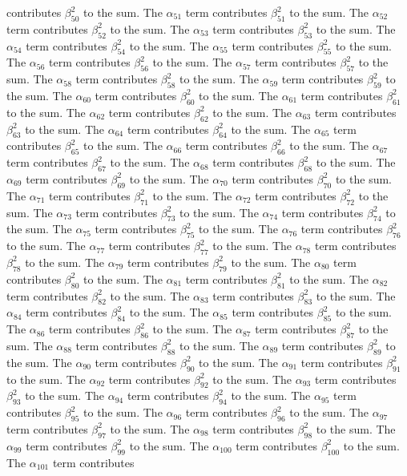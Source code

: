 \begin{lemma}
contributes $\beta_{50}^{2}$ to the sum. The $\alpha_{51}$ term contributes $\beta_{51}^{2}$ to the sum. The $\alpha_{52}$ term contributes $\beta_{52}^{2}$ to the sum. The $\alpha_{53}$ term contributes $\beta_{53}^{2}$ to the sum. The $\alpha_{54}$ term contributes $\beta_{54}^{2}$ to the sum. The $\alpha_{55}$ term contributes $\beta_{55}^{2}$ to the sum. The $\alpha_{56}$ term contributes $\beta_{56}^{2}$ to the sum. The $\alpha_{57}$ term contributes $\beta_{57}^{2}$ to the sum. The $\alpha_{58}$ term contributes $\beta_{58}^{2}$ to the sum. The $\alpha_{59}$ term contributes $\beta_{59}^{2}$ to the sum. The $\alpha_{60}$ term contributes $\beta_{60}^{2}$ to the sum. The $\alpha_{61}$ term contributes $\beta_{61}^{2}$ to the sum. The $\alpha_{62}$ term contributes $\beta_{62}^{2}$ to the sum. The $\alpha_{63}$ term contributes $\beta_{63}^{2}$ to the sum. The $\alpha_{64}$ term contributes $\beta_{64}^{2}$ to the sum. The $\alpha_{65}$ term contributes $\beta_{65}^{2}$ to the sum. The $\alpha_{66}$ term contributes $\beta_{66}^{2}$ to the sum. The $\alpha_{67}$ term contributes $\beta_{67}^{2}$ to the sum. The $\alpha_{68}$ term contributes $\beta_{68}^{2}$ to the sum. The $\alpha_{69}$ term contributes $\beta_{69}^{2}$ to the sum. The $\alpha_{70}$ term contributes $\beta_{70}^{2}$ to the sum. The $\alpha_{71}$ term contributes $\beta_{71}^{2}$ to the sum. The $\alpha_{72}$ term contributes $\beta_{72}^{2}$ to the sum. The $\alpha_{73}$ term contributes $\beta_{73}^{2}$ to the sum. The $\alpha_{74}$ term contributes $\beta_{74}^{2}$ to the sum. The $\alpha_{75}$ term contributes $\beta_{75}^{2}$ to the sum. The $\alpha_{76}$ term contributes $\beta_{76}^{2}$ to the sum. The $\alpha_{77}$ term contributes $\beta_{77}^{2}$ to the sum. The $\alpha_{78}$ term contributes $\beta_{78}^{2}$ to the sum. The $\alpha_{79}$ term contributes $\beta_{79}^{2}$ to the sum. The $\alpha_{80}$ term contributes $\beta_{80}^{2}$ to the sum. The $\alpha_{81}$ term contributes $\beta_{81}^{2}$ to the sum. The $\alpha_{82}$ term contributes $\beta_{82}^{2}$ to the sum. The $\alpha_{83}$ term contributes $\beta_{83}^{2}$ to the sum. The $\alpha_{84}$ term contributes $\beta_{84}^{2}$ to the sum. The $\alpha_{85}$ term contributes $\beta_{85}^{2}$ to the sum. The $\alpha_{86}$ term contributes $\beta_{86}^{2}$ to the sum. The $\alpha_{87}$ term contributes $\beta_{87}^{2}$ to the sum. The $\alpha_{88}$ term contributes $\beta_{88}^{2}$ to the sum. The $\alpha_{89}$ term contributes $\beta_{89}^{2}$ to the sum. The $\alpha_{90}$ term contributes $\beta_{90}^{2}$ to the sum. The $\alpha_{91}$ term contributes $\beta_{91}^{2}$ to the sum. The $\alpha_{92}$ term contributes $\beta_{92}^{2}$ to the sum. The $\alpha_{93}$ term contributes $\beta_{93}^{2}$ to the sum. The $\alpha_{94}$ term contributes $\beta_{94}^{2}$ to the sum. The $\alpha_{95}$ term contributes $\beta_{95}^{2}$ to the sum. The $\alpha_{96}$ term contributes $\beta_{96}^{2}$ to the sum. The $\alpha_{97}$ term contributes $\beta_{97}^{2}$ to the sum. The $\alpha_{98}$ term contributes $\beta_{98}^{2}$ to the sum. The $\alpha_{99}$ term contributes $\beta_{99}^{2}$ to the sum. The $\alpha_{100}$ term contributes $\beta_{100}^{2}$ to the sum. The $\alpha_{101}$ term contributes 
\end{lemma}
